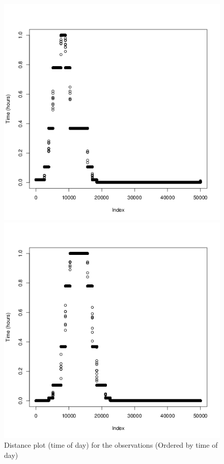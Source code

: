 \documentclass[a4paper, 12pt]{article}
\begin{document}
    \begin{figure}[H]
    \centering
    \caption{Distance plot (time of day) for the observations (Ordered by time of day) \label{fig:time}}
        \begin{minipage}[]{0.2\textwidth}
            \includegraphics[width=\textwidth]{share/1_time.png}
        \end{minipage}
        \begin{minipage}[]{0.2\textwidth}
            \includegraphics[width=\textwidth]{share/2_time.png}

\end{minipage}
\end{figure}
\end{document}
